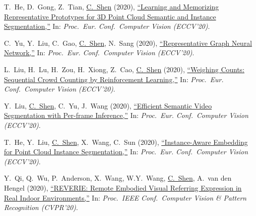 \documentclass[9pt, a4paper]{article}
\newcommand{\years}[1]{\marginnote{\scriptsize #1}}
\def\highlight{\uline}
\begin{document}
\medskip

\years{2020} T.~He, D.~Gong, Z.~Tian, \highlight{C.~Shen} (2020),
\href{http://www.google.com/search?lr=&ie=UTF-8&oe=UTF-8&q=Learning+and+Memorizing+Representative+Prototypes+for+3D+Point+Cloud+Semantic+and+Instance+Segmentation+Tong+He%2C+Dong+Gong%2C+Zhi+Tian%2C+Chunhua+Shen}{``Learning and Memorizing Representative Prototypes for {3D} Point Cloud Semantic and Instance Segmentation,{}''}
In: \emph{Proc.\ Eur. Conf.\  Computer Vision (ECCV'20)}.

\medskip

\years{2020} C.~Yu, Y.~Liu, C.~Gao, \highlight{C.~Shen}, N.~Sang (2020),
\href{http://www.google.com/search?lr=&ie=UTF-8&oe=UTF-8&q=Representative+Graph+Neural+Network+Changqian+Yu%2C+Yifan+Liu%2C+Changxin+Gao%2C+Chunhua+Shen%2C+Nong+Sang}{``Representative Graph Neural Network,{}''}
In: \emph{Proc.\ Eur. Conf.\  Computer Vision (ECCV'20)}.

\medskip

\years{2020} L.~Liu, H.~Lu, H.~Zou, H.~Xiong, Z.~Cao, \highlight{C.~Shen} (2020),
\href{http://www.google.com/search?lr=&ie=UTF-8&oe=UTF-8&q=Weighing+Counts%3A+Sequential+Crowd+Counting+by+Reinforcement+Learning+Liang+Liu%2C+Hao+Lu%2C+Hongwei+Zou%2C+Haipeng+Xiong%2C+Zhiguo+Cao%2C+Chunhua+Shen}{``Weighing Counts: Sequential Crowd Counting by Reinforcement Learning,{}''}
In: \emph{Proc.\ Eur. Conf.\  Computer Vision (ECCV'20)}.

\medskip

\years{2020} Y.~Liu, \highlight{C.~Shen}, C.~Yu, J.~Wang (2020),
\href{http://www.google.com/search?lr=&ie=UTF-8&oe=UTF-8&q=Efficient+Semantic+Video+Segmentation+with+Per-frame+Inference+Yifan+Liu%2C+Chunhua+Shen%2C+Changqian+Yu%2C+Jingdong+Wang}{``Efficient Semantic Video Segmentation with Per-frame Inference,{}''}
In: \emph{Proc.\ Eur. Conf.\  Computer Vision (ECCV'20)}.

\medskip

\years{2020} T.~He, Y.~Liu, \highlight{C.~Shen}, X.~Wang, C.~Sun (2020),
\href{http://www.google.com/search?lr=&ie=UTF-8&oe=UTF-8&q=Instance-Aware+Embedding+for+Point+Cloud+Instance+Segmentation+Tong+He%2C+Yifan+Liu%2C+Chunhua+Shen%2C+Xinlong+Wang%2C+Changming+Sun}{``Instance-Aware Embedding for Point Cloud Instance Segmentation,{}''}
In: \emph{Proc.\ Eur. Conf.\  Computer Vision (ECCV'20)}.

\medskip

\years{2020} Y.~Qi, Q.~Wu, P.~Anderson, X.~Wang, W.Y.~Wang, \highlight{C.~Shen}, A.~van den Hengel (2020),
\href{http://www.google.com/search?lr=&ie=UTF-8&oe=UTF-8&q=REVERIE%3A+Remote+Embodied+Visual+Referring+Expression+in+Real+Indoor+Environments+Yuankai+Qi%2C+Qi+Wu%2C+Peter+Anderson%2C+Xin+Wang%2C+William+Yang+Wang%2C+Chunhua+Shen%2C+Anton+van+den+Hengel}{``{REVERIE}: Remote Embodied Visual Referring Expression in Real Indoor Environments,{}''}
In: \emph{Proc.\ IEEE Conf.\  Computer Vision \& Pattern Recognition (CVPR'20)}.
\end{document}

